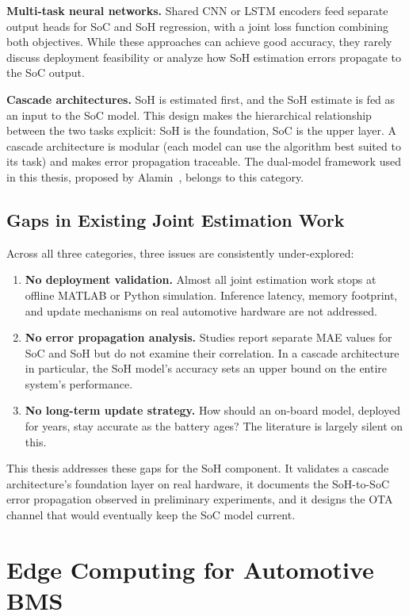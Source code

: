 \textbf{Multi-task neural networks.} Shared CNN or LSTM encoders feed separate output heads for SoC and SoH regression, with a joint loss function combining both objectives. While these approaches can achieve good accuracy, they rarely discuss deployment feasibility or analyze how SoH estimation errors propagate to the SoC output.

\textbf{Cascade architectures.} SoH is estimated first, and the SoH estimate is fed as an input to the SoC model. This design makes the hierarchical relationship between the two tasks explicit: SoH is the foundation, SoC is the upper layer. A cascade architecture is modular (each model can use the algorithm best suited to its task) and makes error propagation traceable. The dual-model framework used in this thesis, proposed by Alamin~\autocite{Alamin2022}, belongs to this category.

\subsection{Gaps in Existing Joint Estimation Work}

Across all three categories, three issues are consistently under-explored:

\begin{enumerate}
    \item \textbf{No deployment validation.} Almost all joint estimation work stops at offline MATLAB or Python simulation. Inference latency, memory footprint, and update mechanisms on real automotive hardware are not addressed.
    \item \textbf{No error propagation analysis.} Studies report separate MAE values for SoC and SoH but do not examine their correlation. In a cascade architecture in particular, the SoH model's accuracy sets an upper bound on the entire system's performance.
    \item \textbf{No long-term update strategy.} How should an on-board model, deployed for years, stay accurate as the battery ages? The literature is largely silent on this.
\end{enumerate}

This thesis addresses these gaps for the SoH component. It validates a cascade architecture's foundation layer on real hardware, it documents the SoH-to-SoC error propagation observed in preliminary experiments, and it designs the OTA channel that would eventually keep the SoC model current.


\section{Edge Computing for Automotive BMS}
\label{sec:bg_edge}


